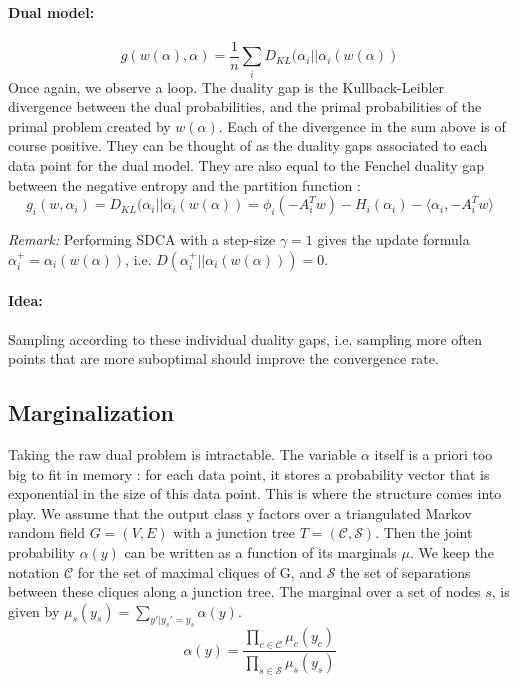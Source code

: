 \documentclass{article}
\DeclareMathOperator{\1}{\mathbb{1}}
\begin{document}
\paragraph{Dual model:}

\begin{equation}
	g(w(\alpha),\alpha) = \frac{1}{n} \sum_i D_{KL} (\alpha_i || \alpha_i(w(\alpha))
\end{equation}
Once again, we observe a loop.
The duality gap is the Kullback-Leibler divergence between the dual probabilities, and the primal  probabilities of the primal problem created by $w(\alpha)$.
Each of the divergence in the sum above is of course positive.
They can be thought of as the duality gaps associated to each data point for the dual model.
They are also equal to the Fenchel duality gap between the negative entropy and the partition function :
\begin{equation*}
	g_i(w,\alpha_i) = D_{KL} (\alpha_i || \alpha_i(w(\alpha)) = \phi_i(-A_i^T w) - H_i(\alpha_i) - \langle \alpha_i, -A_i^T w\rangle 
\end{equation*}

\textit{Remark:} Performing SDCA with a step-size $\gamma=1$ gives the update formula $\alpha_i^+ = \alpha_i(w(\alpha))$, i.e. $ D(\alpha_i^+ || \alpha_i(w(\alpha)) )=0$. 

\paragraph{Idea:} Sampling according to these individual duality gaps, i.e. sampling more often points that are more suboptimal should improve the convergence rate.


\subsection{Marginalization}

Taking the raw dual problem is intractable.
The variable $\alpha$ itself is a priori too big to fit in memory : for each data point, it stores a probability vector that is exponential in the size of this data point.
This is where the structure comes into play.
We assume that the output class y factors over a triangulated Markov random field $G=(V,E)$ with a junction tree $T=(\mathcal{C},\mathcal{S})$.
Then the joint probability $\alpha(y)$ can be written as a function of its marginals $\mu$.
We keep the notation $\mathcal{C}$ for the set of maximal cliques of G, and $\mathcal{S}$ the set of separations between these cliques along a junction tree.
The marginal over a set of nodes $s$, is given by $\mu_s(y_s) = \sum_{y' | y_s'=y_s} \alpha(y)$. 
\begin{equation}
	\label{joint from marginals}
	\alpha(y) = \frac{\prod_{c\in\mathcal{C}} \mu_c(y_c)}{\prod_{s\in\mathcal{S}} \mu_s(y_s)}
\end{equation}
\end{document}
